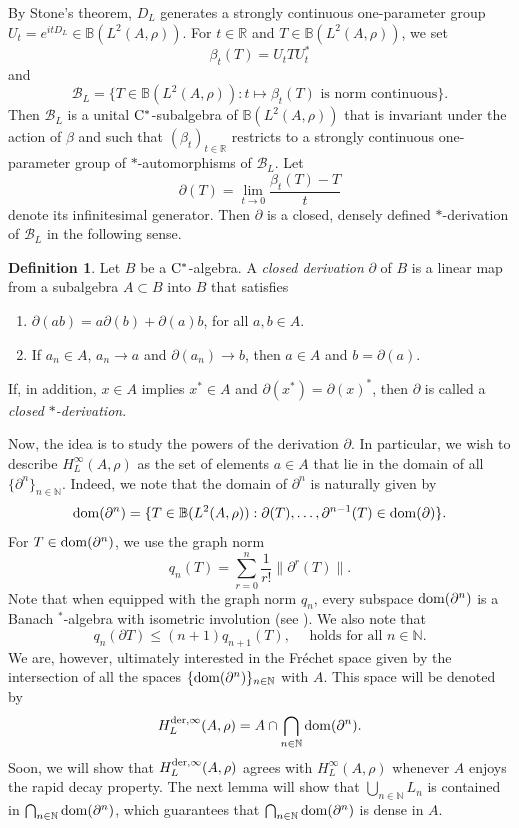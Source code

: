 \documentclass[11pt]{article}
\theoremstyle{definition}
\newtheorem{defn}[thm]{Definition}
\theoremstyle{remark}
\numberwithin{equation}{section}
\numberwithin{equation}{section}
\def\N{\mathbb{N}}
\def\R{\mathbb{R}}
\numberwithin{equation}{section}
\begin{document}
By Stone's theorem, $D_L$ generates a strongly continuous one-parameter group $U_t=e^{itD_L}\in \mathbb B(L^2(A,\rho)) $. For $t\in \R$ and $T\in  \mathbb B(L^2(A,\rho)) $, we set 
$$
\beta_t(T)=U_tTU_t^*
$$
and 
$$
\mathcal B_L=\{T\in \mathbb B(L^2(A,\rho)):t\mapsto\beta_t(T)\text{ is norm continuous}\}.
$$
Then $\mathcal B_L$ is a unital ${\rm C}^*$-subalgebra of $\mathbb B(L^2(A,\rho))$ that is invariant under the action of $\beta$ and such that $(\beta_t)_{t\in\mathbb R}$ restricts to a strongly continuous one-parameter group of $*$-automorphisms of $\mathcal B_L$.  Let
\begin{equation*}
 \partial(T)=\lim_{t\to0}\frac{\beta_t(T)-T}{t}
\end{equation*}
denote its infinitesimal generator. Then $\partial$ is a closed, densely defined $*$-derivation of $\mathcal B_L$ in the following sense.

\begin{defn}
    Let $B$ be a ${\rm C}^*$-algebra. A \emph{closed derivation} $\partial$ of $B$ is a linear map from a subalgebra $A\subset B$ into $B$ that satisfies \begin{enumerate}
    \item[(i)] $\partial(ab)=a\partial(b)+\partial(a)b$, for all $a,b\in A$.
    \item[(ii)] If $a_n\in A$, $a_n\to a$ and $\partial(a_n)\to b$, then $a\in A$ and $b=\partial(a)$.
\end{enumerate} If, in addition, $x\in A$ implies $x^*\in A$ and $\partial(x^*)=\partial(x)^*$, then $\partial$ is called a \emph{closed $*$-derivation}. 
\end{defn}

Now, the idea is to study the powers of the derivation $\partial$. In particular, we wish to describe $H_L^\infty(A,\rho)$ as the set of elements $a\in A$ that lie in the domain of all $\{\partial^n\}_{n\in \N}$. Indeed, we note that the domain of $\partial^n$ is naturally given by
$$
{\rm dom}(\partial^n)=\{T\in  \mathbb B(L^2(A,\rho)): \partial(T),\ldots, \partial^{n-1}(T)\in {\rm dom}(\partial)\}.
$$
For $T\in{\rm dom}(\partial^n)$, we use the graph norm
\begin{equation*}
 q_n(T)=\sum_{r=0}^n\frac{1}{r!}\|\partial^r(T)\|.
\end{equation*}
Note that when equipped with the graph norm $q_n$, every subspace ${\rm dom}(\partial^n)$ is a Banach $^*$-algebra with isometric involution (see \cite{KiSh94}). We also note that 
\begin{equation}\label{continuity}
    q_n(\partial T)\leq (n+1)q_{n+1}(T), \quad\text{ holds for all }n\in\N.
\end{equation}
We are, however, ultimately interested in the Fr\'echet space given by the intersection of all the spaces $\{{\rm dom}(\partial^n)\}_{n\in\N}$ with $A$. This space will be denoted by
$$
H^{{\rm der},\infty}_L(A,\rho)=A\cap \bigcap_{n\in\N} {\rm dom}(\partial^n).
$$
Soon, we will show that $H^{{\rm der},\infty}_L(A,\rho)$ agrees with $H^{\infty}_L(A,\rho)$ whenever $A$ enjoys the rapid decay property. The next lemma will show that $\bigcup_{n\in\N} L_n$ is contained in $\bigcap_{n\in\N} {\rm dom}(\partial^n)$, which guarantees that $\bigcap_{n\in\N}{\rm dom}(\partial^n)$ is dense in $A$.
\end{document}
